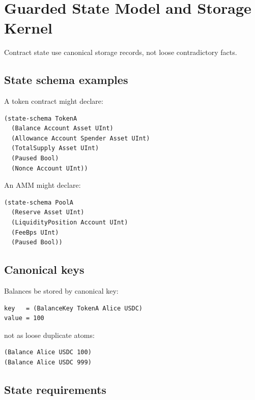 \section{Guarded State Model and Storage Kernel}

Contract state \MUST{} use canonical storage records, not loose contradictory facts.

\subsection{State schema examples}

A token contract might declare:

\begin{lstlisting}
(state-schema TokenA
  (Balance Account Asset UInt)
  (Allowance Account Spender Asset UInt)
  (TotalSupply Asset UInt)
  (Paused Bool)
  (Nonce Account UInt))
\end{lstlisting}

An AMM might declare:

\begin{lstlisting}
(state-schema PoolA
  (Reserve Asset UInt)
  (LiquidityPosition Account UInt)
  (FeeBps UInt)
  (Paused Bool))
\end{lstlisting}

\subsection{Canonical keys}

Balances \SHOULD{} be stored by canonical key:

\begin{lstlisting}
key   = (BalanceKey TokenA Alice USDC)
value = 100
\end{lstlisting}

not as loose duplicate atoms:

\begin{lstlisting}
(Balance Alice USDC 100)
(Balance Alice USDC 999)
\end{lstlisting}

\subsection{State requirements}




